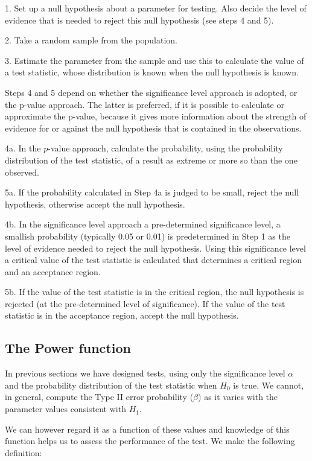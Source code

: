 \documentclass[12pt]{article}
\begin{document}
1. Set up a null hypothesis about a parameter for testing. Also decide the level of evidence that is needed to reject this null hypothesis (see steps 4 and 5).

2. Take a random sample from the population.

3. Estimate the parameter from the sample and use this to calculate the value of a test statistic, whose distribution is known when the null hypothesis is known.

Steps 4 and 5 depend on whether the significance level approach is adopted, or the p-value approach. The latter is preferred, if it is possible to calculate or approximate the p-value, because it gives more information about the strength of evidence for or against the null hypothesis that is contained in the observations.

4a. In the $p$-value approach, calculate the probability, using the  probability distribution of the test statistic, of a result as extreme or more so than the one observed.

5a. If the probability calculated in Step 4a is judged to be small, reject the null hypothesis, otherwise accept the null hypothesis.

4b. In the significance level approach a pre-determined significance level, a smallish probability (typically 0.05 or 0.01) is predetermined in Step 1 as the level of evidence needed to reject the null hypothesis. Using this significance level a critical value of the test statistic is calculated that determines a critical region and an acceptance region.

5b. If the value of the test statistic is in the critical region, the null hypothesis is rejected (at the pre-determined level of significance). If the value of the test statistic is in the acceptance region, accept the null hypothesis.

\subsection{The Power function}
In previous sections we have designed tests, using only the significance level $\alpha$ and the probability distribution of the test statistic when $H_{0}$ is true. We cannot, in general, compute the Type II error probability ($\beta$) as it varies with the parameter values consistent with $H_{1}$.

We can however regard it as a function of these values and knowledge of this function helps us to assess the performance of the test. We make the following definition:
\end{document}
